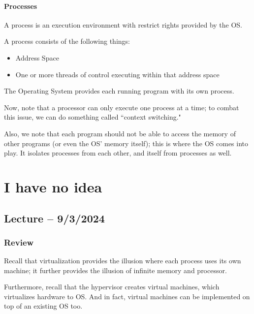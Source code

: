 \documentclass[openany]{book}
\begin{document}
\subsubsection{Processes}
\begin{defn}[Process]
	A process is an execution environment with restrict rights provided by the OS.
\end{defn}

A process consists of the following things:
\begin{itemize}
	\item Address Space
	\item One or more threads of control executing within that address space
\end{itemize}

The Operating System provides each running program with its own process.

Now, note that a processor can only execute one process at a time; to combat this issue, we can do something called ``context switching."

Also, we note that each program should not be able to access the memory of other programs (or even the OS' memory itself); this is where the OS comes into play. It isolates processes from each other, and itself from processes as well.

\chapter{I have no idea}
\section{Lecture -- 9/3/2024}
\subsection{Review}
Recall that virtualization provides the illusion where each process uses its own machine; it further provides the illusion of infinite memory and processor.

Furthermore, recall that the hypervisor creates virtual machines, which virtualizes hardware to OS. And in fact, virtual machines can be implemented on top of an existing OS too.
\end{document}
